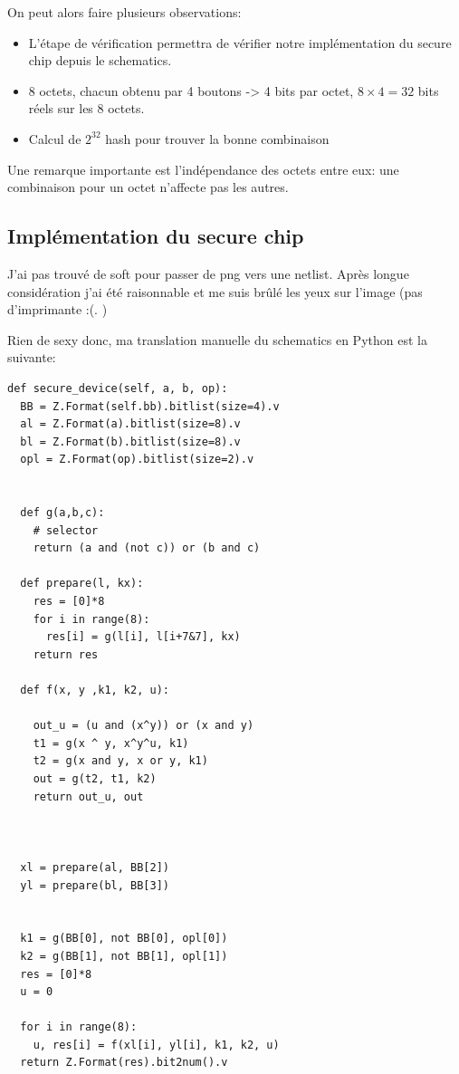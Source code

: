 \documentclass[14pt]{article}
\theoremstyle{definition}
\begin{document}
\vspace*{\baselineskip}


On peut alors faire plusieurs observations:
\begin{itemize}
    \item L'étape de vérification permettra de vérifier notre implémentation du secure chip depuis le schematics.
    \item 8 octets, chacun obtenu par 4 boutons -> 4 bits par octet, $8 \times 4 = 32$ bits réels sur les 8 octets.
    \item Calcul de $2^{32}$ hash pour trouver la bonne combinaison
\end{itemize}


Une remarque importante est l'indépendance des octets entre eux: une combinaison pour un octet n'affecte pas les autres.

\subsection{Implémentation du secure chip}
J'ai pas trouvé de soft pour passer de png vers une netlist. Après longue considération j'ai été raisonnable et me suis brûlé les yeux sur l'image (pas d'imprimante :(. )

Rien de sexy donc, ma translation manuelle du schematics en Python est la suivante:

\begin{verbatim}
def secure_device(self, a, b, op):
  BB = Z.Format(self.bb).bitlist(size=4).v
  al = Z.Format(a).bitlist(size=8).v
  bl = Z.Format(b).bitlist(size=8).v
  opl = Z.Format(op).bitlist(size=2).v


  def g(a,b,c):
    # selector
    return (a and (not c)) or (b and c)

  def prepare(l, kx):
    res = [0]*8
    for i in range(8):
      res[i] = g(l[i], l[i+7&7], kx)
    return res

  def f(x, y ,k1, k2, u):

    out_u = (u and (x^y)) or (x and y)
    t1 = g(x ^ y, x^y^u, k1)
    t2 = g(x and y, x or y, k1)
    out = g(t2, t1, k2)
    return out_u, out



  xl = prepare(al, BB[2])
  yl = prepare(bl, BB[3])


  k1 = g(BB[0], not BB[0], opl[0])
  k2 = g(BB[1], not BB[1], opl[1])
  res = [0]*8
  u = 0

  for i in range(8):
    u, res[i] = f(xl[i], yl[i], k1, k2, u)
  return Z.Format(res).bit2num().v
\end{verbatim}
\end{document}
